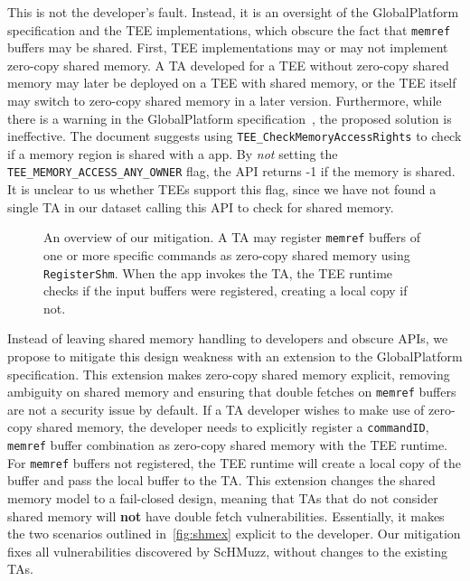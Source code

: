 \documentclass[conference]{IEEEtran}
\newcommand{\sysname}{ScHMuzz\xspace}
\begin{document}
This is not the developer's fault. Instead, it is an oversight of the GlobalPlatform specification and 
the TEE implementations, which obscure the fact that \texttt{memref} buffers may 
be shared. First, TEE implementations may or may not implement zero-copy shared 
memory. A TA developed for a TEE without zero-copy shared memory may later be 
deployed on a TEE with shared memory, or the TEE itself may switch to zero-copy 
shared memory in a later version. Furthermore, while there is a warning in the 
GlobalPlatform specification~\cite{gpintapi}, the proposed solution is ineffective. The document 
suggests using \texttt{TEE\_CheckMemoryAccessRights} to check 
if a memory region is shared with a app. By \emph{not} setting the \texttt{TEE\_MEMORY\_ACCESS\_ANY\_OWNER} 
flag, the API returns -1 if the memory is shared. It  
is unclear to us whether TEEs support this flag, since we have not 
found a single TA in our dataset calling this API to check for shared memory. 

\begin{figure}[]
  \centering
  
  \caption{
    An overview of our mitigation. A TA may register \texttt{memref} buffers of 
    one or more specific commands as zero-copy shared memory using \texttt{RegisterShm}.
    When the app invokes the TA, the TEE runtime checks if the input buffers were registered, 
    creating a local copy if not.
    }
  \label{fig:mitigation}
\end{figure}

Instead of leaving shared memory handling to developers and obscure APIs, we propose 
to mitigate this design weakness with an extension to the GlobalPlatform specification. This extension 
makes zero-copy shared memory explicit, removing ambiguity on shared memory and 
ensuring that double fetches on \texttt{memref} buffers are not a security issue by 
default. If a TA developer wishes to make use of zero-copy shared memory, the developer 
needs to explicitly register a \texttt{commandID},
\texttt{memref} buffer combination as zero-copy shared memory with the TEE runtime. 
For \texttt{memref} buffers not registered, the TEE runtime will create a local 
copy of the buffer and pass the local buffer to the TA. This extension changes 
the shared memory model to a fail-closed design, meaning that TAs that do not 
consider shared memory will \textbf{not} have double fetch vulnerabilities. 
Essentially, it makes the two scenarios outlined in~\autoref{fig:shmex} explicit 
to the developer. Our mitigation fixes all vulnerabilities discovered by \sysname, 
without changes to the existing TAs.
\end{document}
